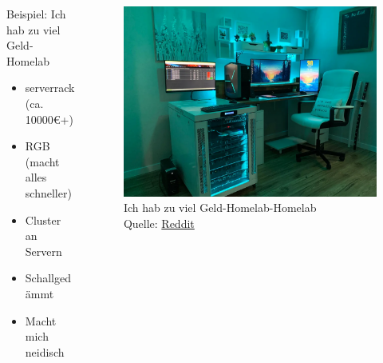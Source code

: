 \documentclass[
    ngerman,
    accentcolor=3b,
    fontsize= 12pt,
    a4paper,
    aspectratio=169,
    colorback=true,
    fancy_row_colors,
    leqno,
    fleqn,
    boxarc=3pt,
    fleqn,
    main,
    design=2008,
]{algoslides}
\begin{document}
    \begin{frame}
        \slidehead{}
        \begin{columns}[T]
            \begin{column}{.5\textwidth}
                Beispiel: Ich hab zu viel Geld-Homelab
                \begin{itemize}
                    \item serverrack (ca. 10000€+)
                    \item RGB (macht alles schneller)
                    \item Cluster an Servern
                    \item Schallgedämmt
                    \item Macht mich neidisch
                \end{itemize}
            \end{column}%
            \begin{column}{.5\textwidth}
                \begin{figure}[ht!]
                    \centering
                    \includegraphics[height=.5\textheight]{ich-hab-zu-viel-geld-setup.png}
                    \caption{Ich hab zu viel Geld-Homelab-Homelab\\Quelle: \href{https://www.reddit.com/r/battlestations/comments/gtjihg/battlestation_meets_homelab/}{Reddit}}
                    \label{fig:ich-hab-zu-viel-geld-homelab}
                \end{figure}
            \end{column}%
        \end{columns}
    \end{frame}
\end{document}
